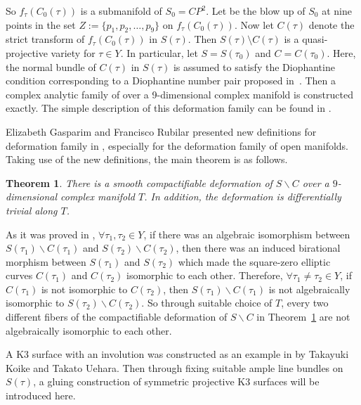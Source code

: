 \documentclass[10pt,a4paper]{amsart}
\numberwithin{equation}{section}
\newtheorem{Theorem}{Theorem}[section]
\def\operatorname#1{#1}
\def\overline#1{#1}
\begin{document}
So $f_\tau(C_0(\tau))$ is a submanifold of $S_0=\operatorname{CP}^2$. Let \smash{$S(\tau)\cong\operatorname{CP}^2 \#9\overline{\operatorname{CP}}^2$} be the blow up of $S_0$ at nine points in the set $Z:=\{p_1,p_2,\dots ,p_9\}$ on $f_\tau(C_0(\tau))$. Now let $C(\tau)$ denote the strict transform of $f_\tau(C_0(\tau))$ in $S(\tau)$. Then $S(\tau)\setminus C(\tau)$ is a quasi-projective variety for $\tau\in Y$. In particular, let $S=S(\tau_0)$ and $C=C(\tau_0)$. Here, the normal bundle of $C(\tau)$ in $S(\tau)$ is assumed to satisfy the Diophantine condition corresponding to a Diophantine number pair proposed in~\cite{Takayuki-Takato2}. Then a complex analytic family of \smash{$\operatorname{CP}^2 \#9\overline{\operatorname{CP}}^2$} over a 9-dimensional complex manifold is constructed exactly. The simple description of this deformation family can be found in \cite{Takayuki-Takato1}.

Elizabeth Gasparim and Francisco Rubilar presented new definitions for deformation family in \cite{Elizabeth-Francisco}, especially for the deformation family of open manifolds. Taking use of the new definitions, the main theorem is as follows.


\begin{Theorem} \label{Theorem1.1}
There is a smooth compactifiable deformation of $S\backslash C$ over a $9$-dimensional complex manifold $T$. In addition, the deformation is differentially trivial along $T$.
\end{Theorem}


As it was proved in \cite{Anna}, $\forall \tau_1, \tau_2 \in\! Y$, if there was an algebraic isomorphism between $S(\tau_1)\backslash C(\tau_1)$ and $S(\tau_2)\backslash C(\tau_2)$, then there was an induced birational morphism between $S(\tau_1)$ and $S(\tau_2)$ which made the square-zero elliptic curves $C(\tau_1)$ and $C(\tau_2)$ isomorphic to each other. Therefore, ${\forall \tau_1 \neq \tau_2 \in Y}$, if $C(\tau_1)$ is not isomorphic to $C(\tau_2)$, then $S(\tau_1)\backslash C(\tau_1)$ is not algebraically isomorphic to $S(\tau_2)\backslash C(\tau_2)$. So through suitable choice of $T$, every two different fibers of the compactifiable deformation of $S\backslash C$ in Theorem~\ref{Theorem1.1} are not algebraically isomorphic to each other.

A K3 surface with an involution was constructed as an example in \cite[Section 7.1.2]{Takayuki-Takato1} by Takayuki Koike and Takato Uehara. Then through fixing suitable ample line bundles on $S(\tau)$, a gluing construction of symmetric projective K3 surfaces will be introduced here.
\end{document}
